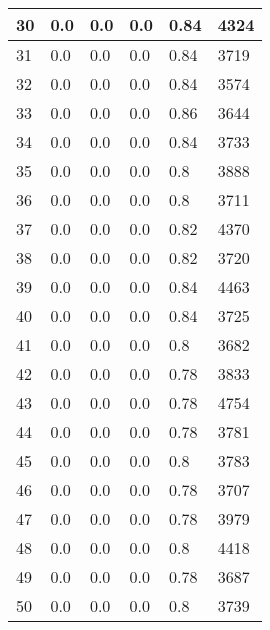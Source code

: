 \begin{longtable}{|l|l|l|l|l|l|}
30 & 0.0 & 0.0 & 0.0 & 0.84 & 4324 \\ \hline 
31 & 0.0 & 0.0 & 0.0 & 0.84 & 3719 \\ \hline 
32 & 0.0 & 0.0 & 0.0 & 0.84 & 3574 \\ \hline 
33 & 0.0 & 0.0 & 0.0 & 0.86 & 3644 \\ \hline 
34 & 0.0 & 0.0 & 0.0 & 0.84 & 3733 \\ \hline 
35 & 0.0 & 0.0 & 0.0 & 0.8 & 3888 \\ \hline 
36 & 0.0 & 0.0 & 0.0 & 0.8 & 3711 \\ \hline 
37 & 0.0 & 0.0 & 0.0 & 0.82 & 4370 \\ \hline 
38 & 0.0 & 0.0 & 0.0 & 0.82 & 3720 \\ \hline 
39 & 0.0 & 0.0 & 0.0 & 0.84 & 4463 \\ \hline 
40 & 0.0 & 0.0 & 0.0 & 0.84 & 3725 \\ \hline 
41 & 0.0 & 0.0 & 0.0 & 0.8 & 3682 \\ \hline 
42 & 0.0 & 0.0 & 0.0 & 0.78 & 3833 \\ \hline 
43 & 0.0 & 0.0 & 0.0 & 0.78 & 4754 \\ \hline 
44 & 0.0 & 0.0 & 0.0 & 0.78 & 3781 \\ \hline 
45 & 0.0 & 0.0 & 0.0 & 0.8 & 3783 \\ \hline 
46 & 0.0 & 0.0 & 0.0 & 0.78 & 3707 \\ \hline 
47 & 0.0 & 0.0 & 0.0 & 0.78 & 3979 \\ \hline 
48 & 0.0 & 0.0 & 0.0 & 0.8 & 4418 \\ \hline 
49 & 0.0 & 0.0 & 0.0 & 0.78 & 3687 \\ \hline 
50 & 0.0 & 0.0 & 0.0 & 0.8 & 3739 \\ \hline 
\end{longtable}